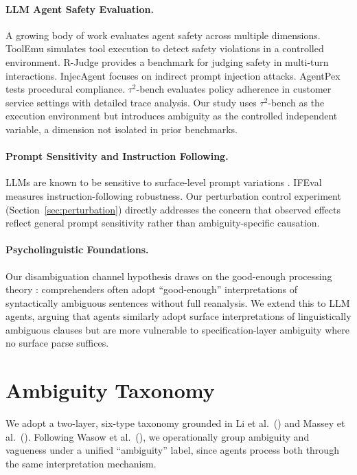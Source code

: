 \documentclass[11pt]{article}
\begin{document}
\paragraph{LLM Agent Safety Evaluation.}
A growing body of work evaluates agent safety across multiple dimensions. ToolEmu \citep{ruan2024toolemu} simulates tool execution to detect safety violations in a controlled environment. R-Judge \citep{yuan2024rjudge} provides a benchmark for judging safety in multi-turn interactions. InjecAgent \citep{liu2024injecagent} focuses on indirect prompt injection attacks. AgentPex \citep{zhang2024agentpex} tests procedural compliance. $\tau^2$-bench \citep{tau2bench2024} evaluates policy adherence in customer service settings with detailed trace analysis. Our study uses $\tau^2$-bench as the execution environment but introduces ambiguity as the controlled independent variable, a dimension not isolated in prior benchmarks.

\paragraph{Prompt Sensitivity and Instruction Following.}
LLMs are known to be sensitive to surface-level prompt variations \citep{sclar2024quantifying, lu2022fantastically}. IFEval \citep{zhou2023ifeval} measures instruction-following robustness. Our perturbation control experiment (Section~\ref{sec:perturbation}) directly addresses the concern that observed effects reflect general prompt sensitivity rather than ambiguity-specific causation.

\paragraph{Psycholinguistic Foundations.}
Our disambiguation channel hypothesis draws on the good-enough processing theory \citep{ferreira2002good, ferreira2007good}: comprehenders often adopt ``good-enough'' interpretations of syntactically ambiguous sentences without full reanalysis. We extend this to LLM agents, arguing that agents similarly adopt surface interpretations of linguistically ambiguous clauses but are more vulnerable to specification-layer ambiguity where no surface parse suffices.

\section{Ambiguity Taxonomy}
\label{sec:taxonomy}

We adopt a two-layer, six-type taxonomy grounded in Li et al.\ (\citeyear{li2024drip}) and Massey et al.\ (\citeyear{massey2014}). Following Wasow et al.\ (\citeyear{wasow2005}), we operationally group ambiguity and vagueness under a unified ``ambiguity'' label, since agents process both through the same interpretation mechanism.
\end{document}

